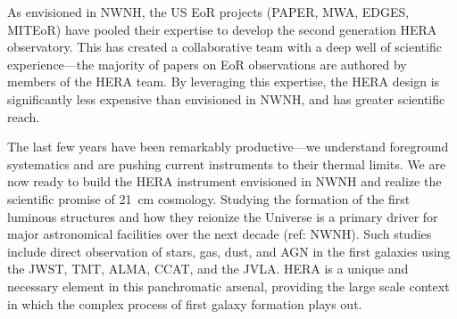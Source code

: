 \documentclass[preprint]{aastex}
\begin{document}
As envisioned in NWNH, the US EoR projects (PAPER, MWA, EDGES, MITEoR) have
pooled their expertise to develop the second generation HERA observatory. This
has created a collaborative team with a deep well of scientific
experience---the majority of papers on EoR observations are authored by members
of the HERA team. By leveraging this expertise, the HERA design is significantly
less expensive than envisioned in NWNH, and has greater scientific reach.

The last few years have been remarkably productive---we
understand foreground systematics and are pushing current
instruments to their thermal limits. We are now ready to build the HERA
instrument envisioned in NWNH and realize the scientific promise of 21~cm
cosmology.
Studying the formation of the first luminous structures 
and how they reionize the Universe is a primary driver for 
major astronomical facilities over the next decade (ref: NWNH).
Such studies include direct observation of stars, gas, dust, and AGN in the
first galaxies using the JWST, TMT, ALMA, CCAT, and the JVLA. HERA is 
a unique and necessary element in this panchromatic arsenal, providing
the large scale context in which the complex process of first galaxy
formation plays out.

\clearpage
\setcounter{page}{1}
\thispagestyle{empty}
%
%

%

\end{document}
